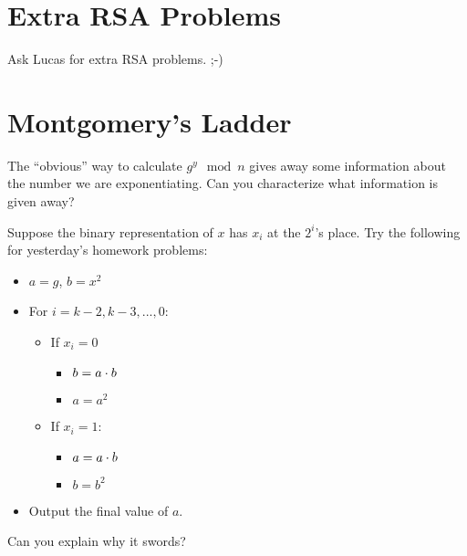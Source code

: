 \documentclass[12pt]{article}
\begin{document}
\section{Extra RSA Problems}

Ask Lucas for extra RSA problems. ;-)


\section{Montgomery's Ladder}

The ``obvious'' way to calculate $g^y \mod n$ gives away some information about the number we are exponentiating. Can you characterize what information is given away?

Suppose the binary representation of $x$ has $x_i$ at the $2^i$'s place. Try the following for yesterday's homework problems:


\begin{itemize}
\item $a = g$, $b=x^2$
\item For $i = k-2, k-3, ..., 0$:
\begin{itemize}
\item If $x_i = 0$
\begin{itemize}
\item $b = a \cdot b$
\item $a = a^2$
\end{itemize}
\item If $x_i = 1$:
\begin{itemize}
\item $a = a \cdot b$
\item $b = b^2$
\end{itemize}
\end{itemize}
\item Output the final value of $a$.
\end{itemize}

Can you explain why it swords?
\end{document}
